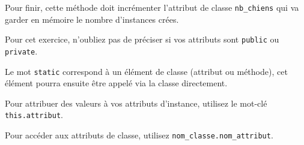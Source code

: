 \begin{Exercice}[10 minutes]
   	Pour finir, cette méthode doit incrémenter l'attribut de classe \lstinline{nb_chiens} qui va garder en mémoire le nombre d'instances crées.
   	
\begin{conseil}

   Pour cet exercice, n'oubliez pas de préciser si vos attributs sont \lstinline{public} ou \lstinline{private}.
   
   Le mot \lstinline{static} correspond à un élément de classe (attribut ou méthode), cet élément pourra ensuite être appelé via la classe directement.
   
   Pour attribuer des valeurs à vos attributs d'instance, utilisez le mot-clé \lstinline{this.attribut}.
   
   Pour accéder aux attributs de classe, utilisez \lstinline{nom_classe.nom_attribut}.
\end{conseil}
    
\begin{solution}
	
\end{solution}
\end{Exercice}

